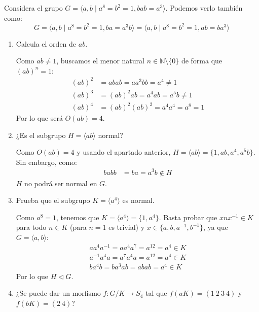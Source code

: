 \documentclass[12pt]{article}
\begin{document}
    \begin{ejercicio}[2.5 puntos]
        Considera el grupo $G=\langle a,b\mid a^8 = b^2 = 1, bab = a^3 \rangle $. \newline
        Podemos verlo también como:
        \begin{equation*}
            G = \langle a,b \mid a^8 = b^2 = 1, ba = a^3b \rangle  = \langle a,b\mid a^8 = b^2 = 1, ab = ba^3 \rangle 
        \end{equation*}
        \begin{enumerate}
            \item Calcula el orden de $ab$.

                Como $ab \neq 1$, buscamos el menor natural $n\in \mathbb{N}\setminus \{0\}$ de forma que ${(ab)}^{n} = 1$:
                \begin{align*}
                    {(ab)}^{2} &= abab = aa^3bb = a^4 \neq 1 \\
                    {(ab)}^{3} &= {(ab)}^{2}ab = a^4ab = a^5b \neq 1 \\
                    {(ab)}^{4} &= {(ab)}^{2}{(ab)}^{2} = a^4a^4 = a^8 = 1
                \end{align*}
                Por lo que será $O(ab) = 4$.
            \item ¿Es el subgrupo $H = \langle ab \rangle $ normal?

                Como $O(ab) = 4$ y usando el apartado anterior, $H= \langle ab \rangle = \{1, ab, a^4, a^5b\}$. Sin embargo, como:
                \begin{align*}
                    babb &= ba = a^3b \notin H
                \end{align*}
                $H$ no podrá ser normal en $G$.
            \item Prueba que el subgrupo $K = \langle a^4 \rangle $ es normal.

                Como $a^8 = 1$, tenemos que $K = \langle a^4 \rangle = \{1,a^4\} $.
                Basta probar que $xnx^{-1}\in K$ para todo $n\in K$ (para $n=1$ es trivial) y $x\in \{a,b,a^{-1},b^{-1}\}$, ya que $G = \langle a,b \rangle $:
                \begin{align*}
                    aa^4a^{-1} = aa^4a^7 = a^{12}= a^4 \in K \\
                    a^{-1}a^4a = a^7a^4a = a^{12} = a^4 \in K \\
                    ba^4b = ba^3ab = abab = a^4 \in K
                \end{align*}
                Por lo que $H\lhd G$.
            \item ¿Se puede dar un morfismo $f:G/K\to S_4$ tal que $f(aK)=(1\ 2\ 3\ 4)$ y $f(bK) = (2\ 4)$?


\end{enumerate}
\end{ejercicio}
\end{document}
